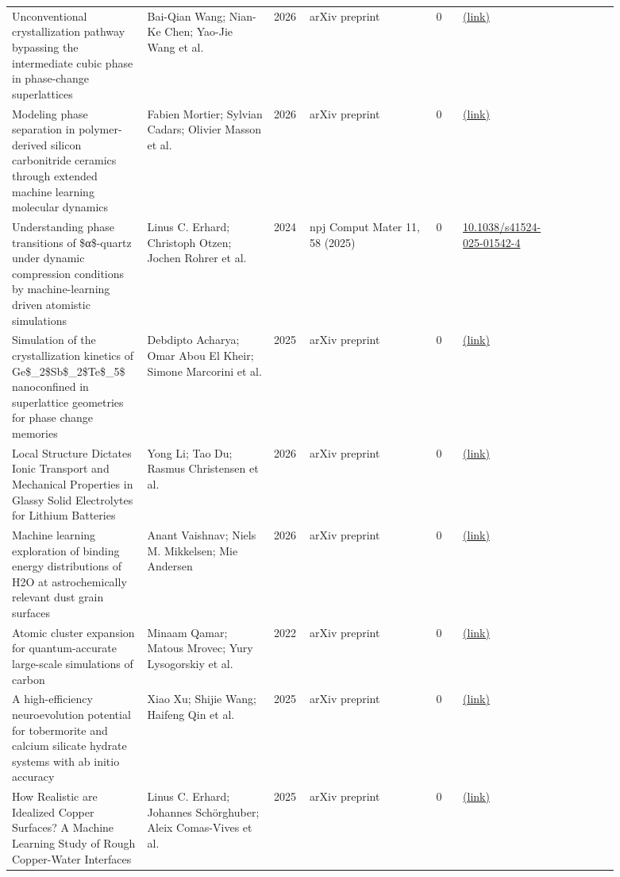 \documentclass[10pt,a4paper]{article}
\begin{document}
{\begin{longtable}{p{0.192\linewidth}p{0.192\linewidth}p{0.043\linewidth}p{0.192\linewidth}p{0.043\linewidth}p{0.132\linewidth}p{0.096\linewidth}}
Unconventional crystallization pathway bypassing the intermediate cubic phase in phase-change superlattices & Bai-Qian Wang; Nian-Ke Chen; Yao-Jie Wang et al. & 2026 & arXiv preprint & 0 & \href{http://arxiv.org/abs/2606.03309v1}{(link)} &  \\
Modeling phase separation in polymer-derived silicon carbonitride ceramics through extended machine learning molecular dynamics & Fabien Mortier; Sylvian Cadars; Olivier Masson et al. & 2026 & arXiv preprint & 0 & \href{http://arxiv.org/abs/2605.20358v2}{(link)} &  \\
Understanding phase transitions of \$α\$-quartz under dynamic compression conditions by machine-learning driven atomistic simulations & Linus C. Erhard; Christoph Otzen; Jochen Rohrer et al. & 2024 & npj Comput Mater 11, 58 (2025) & 0 & \href{https://doi.org/10.1038/s41524-025-01542-4}{10.1038/s41524-025-01542-4} &  \\
Simulation of the crystallization kinetics of Ge\$\_2\$Sb\$\_2\$Te\$\_5\$ nanoconfined in superlattice geometries for phase change memories & Debdipto Acharya; Omar Abou El Kheir; Simone Marcorini et al. & 2025 & arXiv preprint & 0 & \href{http://arxiv.org/abs/2501.18370v1}{(link)} &  \\
Local Structure Dictates Ionic Transport and Mechanical Properties in Glassy Solid Electrolytes for Lithium Batteries & Yong Li; Tao Du; Rasmus Christensen et al. & 2026 & arXiv preprint & 0 & \href{http://arxiv.org/abs/2608.06895v1}{(link)} &  \\
Machine learning exploration of binding energy distributions of H2O at astrochemically relevant dust grain surfaces & Anant Vaishnav; Niels M. Mikkelsen; Mie Andersen & 2026 & arXiv preprint & 0 & \href{http://arxiv.org/abs/2602.11050v1}{(link)} &  \\
Atomic cluster expansion for quantum-accurate large-scale simulations of carbon & Minaam Qamar; Matous Mrovec; Yury Lysogorskiy et al. & 2022 & arXiv preprint & 0 & \href{http://arxiv.org/abs/2210.09161v4}{(link)} &  \\
A high-efficiency neuroevolution potential for tobermorite and calcium silicate hydrate systems with ab initio accuracy & Xiao Xu; Shijie Wang; Haifeng Qin et al. & 2025 & arXiv preprint & 0 & \href{http://arxiv.org/abs/2505.18993v1}{(link)} &  \\
How Realistic are Idealized Copper Surfaces? A Machine Learning Study of Rough Copper-Water Interfaces & Linus C. Erhard; Johannes Schörghuber; Aleix Comas-Vives et al. & 2025 & arXiv preprint & 0 & \href{http://arxiv.org/abs/2509.17833v1}{(link)} &  \\

\end{longtable}}
\end{document}
